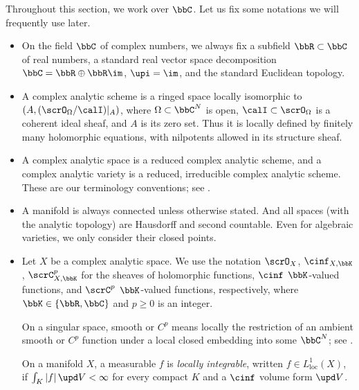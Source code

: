 \begin{notation}[label=\labelNFM{notation:complex-geometry}, status=draft, tag=0000000]
	Throughout this section, we work over $\bbC$.
	Let us fix some notations we will frequently use later.
	\begin{itemize}
		\item On the field $\bbC$ of complex numbers, we always fix a subfield $\bbR \subset \bbC$ of real numbers, a standard real vector space decomposition $\bbC = \bbR \oplus \bbR \im$, $\upi = \im$, and the standard Euclidean topology.
		\item A complex analytic scheme is a ringed space locally isomorphic to $(A,(\scrO_\Omega/\calI)|_A)$, where $\Omega \subset \bbC^N$ is open, $\calI \subset \scrO_\Omega$ is a coherent ideal sheaf, and $A$ is its zero set.
		      Thus it is locally defined by finitely many holomorphic equations, with nilpotents allowed in its structure sheaf.

		\item A complex analytic space is a reduced complex analytic scheme, and a complex analytic variety is a reduced, irreducible complex analytic scheme.
		      These are our terminology conventions; see \cite[Chapter~II, \S 5 and \S 9]{Demailly-2012-ComplexAnalyticDifferential}.

		\item A manifold is always connected unless otherwise stated.
		      And all spaces (with the analytic topology) are Hausdorff and second countable.
		      Even for algebraic varieties, we only consider their closed points.

		\item Let $X$ be a complex analytic space.
		      We use the notation $\scrO_X$, $\cinf_{X,\bbK}$, $\scrC^p_{X,\bbK}$ for the sheaves of holomorphic functions, $\cinf$ $\bbK$-valued functions, and $\scrC^p$ $\bbK$-valued functions, respectively, where $\bbK \in \{\bbR,\bbC\}$ and $p \geq 0$ is an integer.

		      On a singular space, smooth or $C^p$ means locally the restriction of an ambient smooth or $C^p$ function under a local closed embedding into some $\bbC^N$; see \cite[Section 3.2]{Barlet-Magnusson-2019-ComplexAnalyticCycles}.

		      On a manifold $X$, a measurable $f$ is \emph{locally integrable}, written $f \in L^1_{\mathrm{loc}}(X)$,
		      if $\int_K |f|\,\upd V < \infty$ for every compact $K$ and a $\cinf$ volume form $\upd V$.


\end{itemize}
\end{notation}

